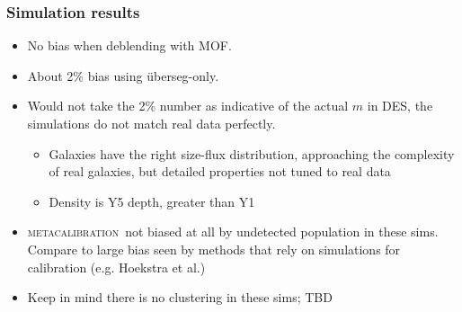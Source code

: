 \documentclass{beamer}
\newcommand{\mcal}{\textsc{metacalibration}}
\newcommand{\uberseg}{{\color{lightsteelblue} {\"u}berseg}}
\newcommand{\MOF}{{\color{brightred}MOF}}
\begin{document}
\frame
{

    \frametitle{Simulation results}


    \begin{itemize}

        \item No bias when deblending with \MOF.

        \item About 2\% bias using \uberseg-only.

        \item Would not take the 2\% number as indicative of the actual $m$ in
            DES, the simulations do not match real data perfectly.
            \begin{itemize}

                \item Galaxies have the right size-flux distribution,
                    approaching the complexity of real galaxies, but detailed
                    properties not tuned to real data

                \item Density is Y5 depth, greater than Y1

            \end{itemize}



        \item \mcal\ not biased at all by undetected population in these sims.
            Compare to large bias seen by methods that rely on simulations for
            calibration (e.g. Hoekstra et al.)

        \item Keep in mind there is no clustering in these sims; TBD

    \end{itemize}
}
\end{document}
